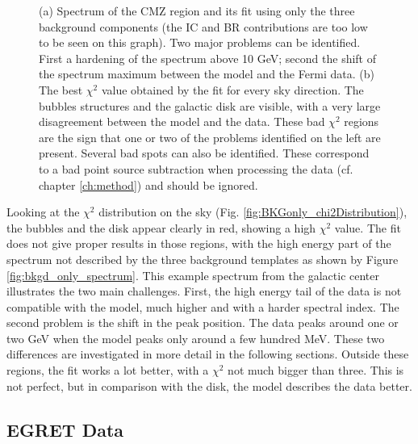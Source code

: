 \begin{figure}[h]
\begin{minipage}[h]{0.45\textwidth}
  	\subcaption{}
  	\label{fig:bkgd_only_spectrum}
  \end{minipage}
  \caption[CMZ fitted with the background components.]{(a) Spectrum of the CMZ region and its fit using only the three background components (the IC and BR contributions are too low to be seen on this graph). Two major problems can be identified. First a hardening of the spectrum above 10 GeV; second the shift of the spectrum maximum between the model and the Fermi data. (b) The best $\chi^2$ value obtained by the fit for every sky direction. The bubbles structures and the galactic disk are visible, with a very large disagreement between the model and the data. These bad $\chi^2$ regions are the sign that one or two of the problems identified on the left are present. Several bad spots can also be identified. These correspond to a bad point source subtraction when processing the data (cf. chapter \ref{ch:method}) and should be ignored.}
  \label{}
\end{figure}


Looking at the $\chi^2$ distribution on the sky (Fig. \ref{fig:BKGonly_chi2Distribution}), the bubbles and the disk appear clearly in red, showing a high $\chi^2$ value. The fit does not give proper results in those regions, with the high energy part of the spectrum not described by the three background templates as shown by Figure \ref{fig:bkgd_only_spectrum}. This example spectrum from the galactic center illustrates the two main challenges. First, the high energy tail of the data is not compatible with the model, much higher and with a harder spectral index. The second problem is the shift in the peak position. The data peaks around one or two GeV when the model peaks only around a few hundred MeV. These two differences are investigated in more detail in the following sections.
Outside these regions, the fit works a lot better, with a $\chi^2$ not much bigger than three. This is not perfect, but in comparison with the disk, the model describes the data better.



\newpage
\subsection{EGRET Data}

